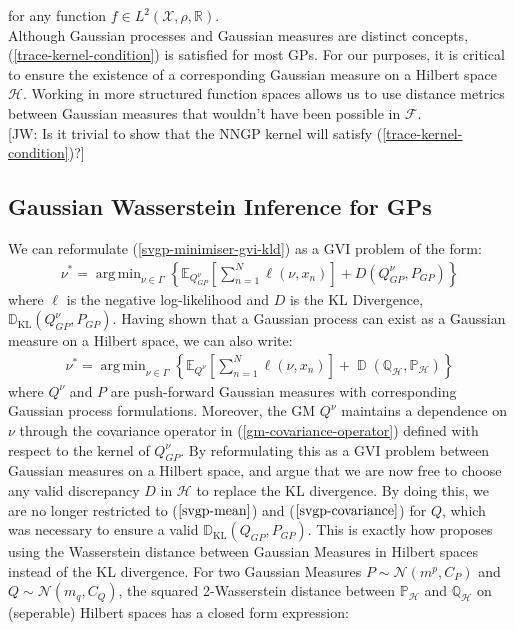 \documentclass{article}
\newcommand{\jw}[1]{{\color{gray} [JW: #1]}}
\newcommand{\KLD}{\operatorname{\mathbb{D}_{KL}}}
\newcommand{\D}{\operatorname{\mathbb{D}}}
\DeclareMathOperator*{\argmin}{arg\,min}
\numberwithin{equation}{section}
\begin{document}
for any function $f \in L^2(\mathcal{X}, \rho, \mathbb{R})$. \\
\newline
Although Gaussian processes and Gaussian measures are distinct concepts, (\ref{trace-kernel-condition}) is satisfied for most GPs. For our purposes, it is critical to ensure the existence of a corresponding Gaussian measure on a Hilbert space $\mathcal{H}$. Working in more structured function spaces allows us to use distance metrics between Gaussian measures that wouldn't have been possible in $\mathcal{F}$.
\\\jw{Is it trivial to show that the NNGP kernel will satisfy (\ref{trace-kernel-condition})?}

\subsection{Gaussian Wasserstein Inference for GPs}
We can reformulate (\ref{svgp-minimiser-gvi-kld}) as a GVI problem of the form:
\begin{align}
    \label{svgp-gwi-gp}
    \nu^* = \argmin_{\nu \in \Gamma} \left\{ \mathbb{E}_{Q_{GP}^{\nu}}\left[\sum_{n=1}^N \ell(\nu, x_n)\right] + D(Q_{GP}^{\nu}, P_{GP})\right\}
\end{align}
where $\ell$ is the negative log-likelihood and $D$ is the KL Divergence, $\KLD(Q_{GP}^{\nu}, P_{GP})$. Having shown that a Gaussian process can exist as a Gaussian measure on a Hilbert space, we can also write:
\begin{align}
    \label{svgp-gwi-gm}
    \nu^* = \argmin_{\nu \in \Gamma} \left\{ \mathbb{E}_{Q^{\nu}}\left[\sum_{n=1}^N \ell(\nu, x_n)\right] + \D(\mathbb{Q}_{\mathcal{H}}, \mathbb{P}_{\mathcal{H}})\right\}
\end{align}
where $Q^{\nu}$ and $P$ are push-forward Gaussian measures with corresponding Gaussian process formulations. Moreover, the GM $Q^{\nu}$ maintains a dependence on $\nu$ through the covariance operator in (\ref{gm-covariance-operator}) defined with respect to the kernel of $Q_{GP}^{\nu}$. By reformulating this as a GVI problem between Gaussian measures on a Hilbert space, \cite{wild2022generalized} and \cite{knoblauch2022optimization} argue that we are now free to choose any valid discrepancy $D$ in $\mathcal{H}$ to replace the KL divergence. By doing this, we are no longer restricted to ($\ref{svgp-mean}$) and ($\ref{svgp-covariance}$) for $Q$, which was necessary to ensure a valid $\KLD(Q_{GP},  P_{GP})$. This is exactly how \cite{wild2022generalized} proposes using the Wasserstein distance between Gaussian Measures in Hilbert spaces instead of the KL divergence. For two Gaussian Measures $P \sim \mathcal{N}(m^p, C_P)$ and $Q \sim \mathcal{N}(m_q, C_Q)$, the squared 2-Wasserstein distance between $\mathbb{P}_{\mathcal{H}}$ and $\mathbb{Q}_{\mathcal{H}}$ on (seperable) Hilbert spaces has a closed form expression:
\end{document}
